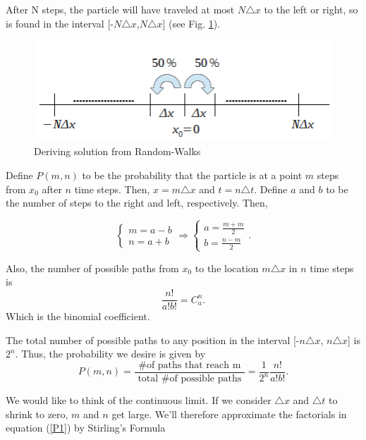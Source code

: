 \documentclass[]{article}
\numberwithin{equation}{section}		%
\newcommand{\delx}{\triangle{}x}
\newcommand{\delt}{\triangle{}t}
\begin{document}
After N steps, the particle will have traveled at most $N\delx$ to
the left or right, so is found in the interval [-$N\delx$,$N\delx$]
(see Fig. \ref{fig_step}).

\begin{figure}[b]
\begin{center}
\includegraphics[scale=0.5]{figures/derive_diffusion_random_walk.png}
\end{center}
\caption{Deriving solution from Random-Walks \label{derive diffusion}}
\label{fig_step}
\end{figure}

Define $P(m,n)$ to be the probability that the particle
is at a point $m$ steps from $x_0$ after $n$ time steps. Then,
$x=m\delx$ and $t=n\delt$. Define $a$ and $b$ to be the number of
steps to the right and left, respectively. Then,

\begin{equation}
\begin{cases}
m=a-b\\
n=a+b
\end{cases}\Rightarrow\begin{cases}
a=\frac{m+m}{2}\\
b=\frac{n-m}{2}
\end{cases}.
\end{equation}

\indent Also, the number of possible paths from $x_0$ to the location $m\delx$ in
$n$ time steps is
\begin{equation}
    \frac{n!}{a!b!}=C^n_a.
\end{equation}
 Which is the binomial coefficient. 
 
The total number of possible paths to any position in the interval
[-$n\delx$, $n\delx$] is $2^n$. Thus, the probability we desire is
given by
\begin{equation}\label{P1}
    P(m,n)=\frac{\mbox{ \# of paths that reach m }}{\mbox{ total \# of possible paths }}=\frac{1}{2^n}\frac{n!}{a!b!}.
\end{equation}

\indent We would like to think of the continuous limit. If we consider
$\delx$ and $\delt$ to shrink to zero, $m$ and $n$ get large. We'll
therefore approximate the factorials in equation (\ref{P1}) by Stirling's Formula
\end{document}
